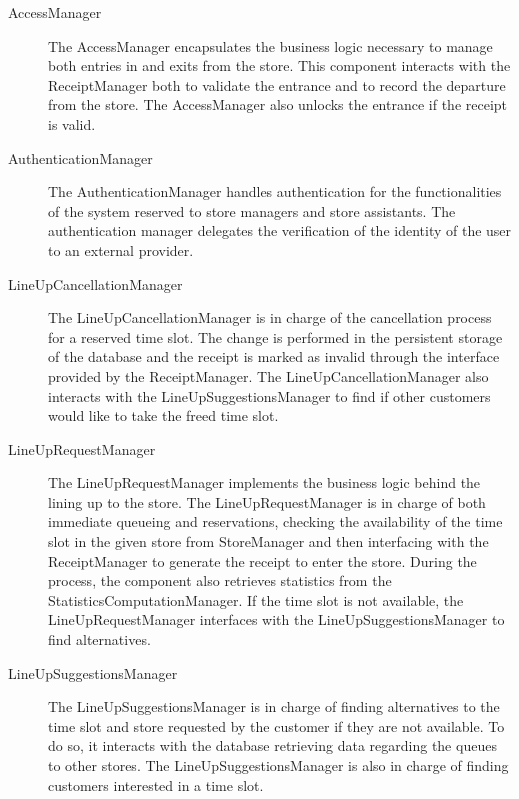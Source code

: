 \documentclass[../../main.tex]{subfiles}
\begin{document}
\begin{description}
    
    \item[AccessManager] The AccessManager encapsulates the business logic necessary to manage both entries in and exits from the store. 
    This component interacts with the ReceiptManager both to validate the entrance and to record the departure from the store. 
    The AccessManager also unlocks the entrance if the receipt is valid. 

    \item[AuthenticationManager] The AuthenticationManager handles authentication for the functionalities of the 
    system reserved to store managers and store assistants. The authentication manager delegates the verification of the 
    identity of the user to an external provider.

    \item[LineUpCancellationManager] The LineUpCancellationManager is in charge of the cancellation process for 
    a reserved time slot. The change is performed in the persistent storage of the database and the receipt is marked as 
    invalid through the interface provided by the ReceiptManager.
    The LineUpCancellationManager also interacts with the LineUpSuggestionsManager to find if other customers would like to take 
    the freed time slot.
    
    \item[LineUpRequestManager] The LineUpRequestManager implements the business logic behind the lining up to the store. 
    The LineUpRequestManager is in charge of both immediate queueing and reservations, 
    checking the availability of the time slot in the given store from StoreManager and then interfacing with the 
    ReceiptManager to generate the receipt to enter the store. During the process, the component also retrieves 
    statistics from the StatisticsComputationManager.
    If the time slot is not available, the LineUpRequestManager interfaces with the LineUpSuggestionsManager to find alternatives.

    \item[LineUpSuggestionsManager] The LineUpSuggestionsManager is in charge of finding alternatives to the time slot and 
    store requested by the customer if they are not available. To do so, it interacts with the database retrieving data 
    regarding the queues to other stores. The LineUpSuggestionsManager is also in charge of finding customers interested in a 
    time slot.


\end{description}
\end{document}
